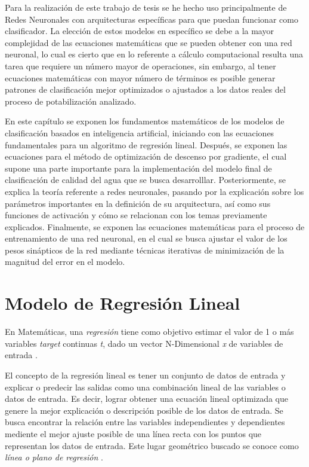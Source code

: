 Para la realización de este trabajo de tesis se he hecho uso principalmente de Redes Neuronales con arquitecturas específicas para que puedan funcionar como clasificador. La elección de estos modelos en específico se debe 
a la mayor complejidad de las ecuaciones matemáticas que se pueden obtener con una red neuronal, lo cual es cierto que en lo referente a cálculo computacional resulta una tarea que requiere un número mayor de operaciones, 
sin embargo, al tener ecuaciones matemáticas con mayor número de términos es posible generar patrones de clasificación mejor optimizados o ajustados a los datos reales del proceso de potabilización analizado.

En este capítulo se exponen los fundamentos matemáticos de los modelos de clasificación basados en inteligencia artificial, iniciando con las ecuaciones fundamentales para un algoritmo de regresión lineal. Después, 
se exponen las ecuaciones para el método de optimización de descenso por gradiente, el cual supone una parte importante para la implementación del modelo final de clasificación de calidad del agua que se busca desarrolllar.
Posteriormente, se explica la teoría referente a redes neuronales, pasando por la explicación sobre los parámetros importantes en la definición de su arquitectura, así como sus funciones de activación y cómo se relacionan 
con los temas previamente explicados. Finalmente, se exponen las ecuaciones matemáticas para el proceso de entrenamiento de una red neuronal, en el cual se busca ajustar el valor de los pesos sinápticos de la red mediante 
técnicas iterativas de minimización de la magnitud del error en el modelo. 

\section{Modelo de Regresión Lineal}

En Matemáticas, una \textit{regresión} tiene como objetivo estimar el valor de 1 o más variables \textit{target} continuas \textit{t}, dado un vector N-Dimensional \textit{x} de variables de entrada \cite{bishop}.

El concepto de la regresión lineal es tener un conjunto de datos de entrada y explicar o predecir las salidas como una combinación lineal de las variables o datos de entrada. Es decir, lograr obtener una ecuación lineal 
optimizada que genere la mejor explicación o descripción posible de los datos de entrada. Se busca encontrar la relación entre las variables independientes y dependientes mediente el mejor ajuste posible de una línea recta 
con los puntos que representan los datos de entrada. Este lugar geométrico buscado se conoce como \textit{línea o plano de regresión} \cite{BigDataCandel}.

